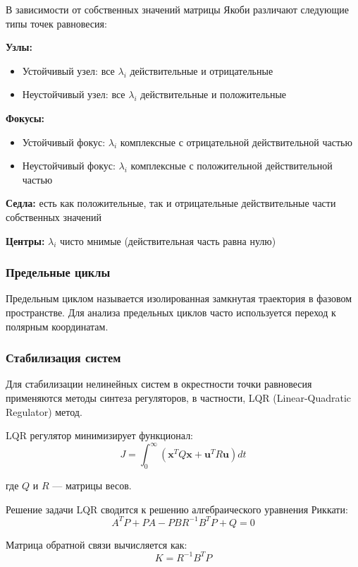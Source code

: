 В зависимости от собственных значений матрицы Якоби различают следующие типы точек равновесия:

\textbf{Узлы:}
\begin{itemize}
\item Устойчивый узел: все $\lambda_i$ действительные и отрицательные
\item Неустойчивый узел: все $\lambda_i$ действительные и положительные
\end{itemize}

\textbf{Фокусы:}
\begin{itemize}
\item Устойчивый фокус: $\lambda_i$ комплексные с отрицательной действительной частью
\item Неустойчивый фокус: $\lambda_i$ комплексные с положительной действительной частью
\end{itemize}

\textbf{Седла:} есть как положительные, так и отрицательные действительные части собственных значений

\textbf{Центры:} $\lambda_i$ чисто мнимые (действительная часть равна нулю)

\subsubsection*{Предельные циклы}

Предельным циклом называется изолированная замкнутая траектория в фазовом пространстве. Для анализа предельных циклов часто используется переход к полярным координатам.

\subsubsection*{Стабилизация систем}

Для стабилизации нелинейных систем в окрестности точки равновесия применяются методы синтеза регуляторов, в частности, LQR (Linear-Quadratic Regulator) метод.

LQR регулятор минимизирует функционал:
$$J = \int_0^{\infty} (\mathbf{x}^T Q \mathbf{x} + \mathbf{u}^T R \mathbf{u}) dt$$

где $Q$ и $R$ --- матрицы весов.

Решение задачи LQR сводится к решению алгебраического уравнения Риккати:
$$A^T P + PA - PBR^{-1}B^T P + Q = 0$$

Матрица обратной связи вычисляется как:
$$K = R^{-1}B^T P$$
